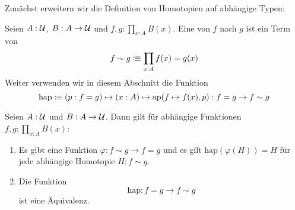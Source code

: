 Zunächst erweitern wir die Definition von Homotopien auf abhängige Typen:
\begin{definition}
  Seien $A:\mathcal{U}$, $B:A\to \mathcal{U}$ und $f,g:\prod_{x:A}B(x)$. Eine \index{$\sim$} von $f$ nach $g$ ist ein Term von
  \[
    f\sim g\vcentcolon\mspace{-1.2mu}\equiv \prod_{x:A}f(x)=g(x)
  \]
  Weiter verwenden wir in diesem Abschnitt die Funktion
  \[
    \mathrm{hap}\vcentcolon\mspace{-1.2mu}\equiv (p:f=g)\mapsto (x:A)\mapsto\mathrm{ap}(f\mapsto f(x),p) :f=g\to f\sim g
  \]
\end{definition}

\begin{theorem}
  Seien $A:\mathcal{U}$ und $B:A\to\mathcal{U}$. Dann gilt für abhängige Funktionen $f,g:\prod_{x:A}B(x)$:
  \begin{enumerate}
  \item Es gibt eine Funktion $\varphi:f\sim g \to f = g$ und es gilt $\mathrm{hap}(\varphi(H))=H$ für jede abhängige Homotopie $H:f\sim g$.
  \item Die Funktion
    \[
      \mathrm{hap} :f=g\to f\sim g
    \]
    ist eine Äquivalenz.
  \end{enumerate}
\end{theorem}
